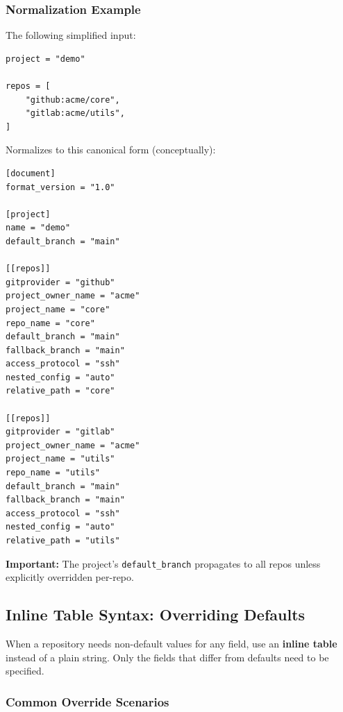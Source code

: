 \subsubsection{Normalization Example}

The following simplified input:

\begin{lstlisting}
project = "demo"

repos = [
    "github:acme/core",
    "gitlab:acme/utils",
]
\end{lstlisting}

Normalizes to this canonical form (conceptually):

\begin{lstlisting}
[document]
format_version = "1.0"

[project]
name = "demo"
default_branch = "main"

[[repos]]
gitprovider = "github"
project_owner_name = "acme"
project_name = "core"
repo_name = "core"
default_branch = "main"
fallback_branch = "main"
access_protocol = "ssh"
nested_config = "auto"
relative_path = "core"

[[repos]]
gitprovider = "gitlab"
project_owner_name = "acme"
project_name = "utils"
repo_name = "utils"
default_branch = "main"
fallback_branch = "main"
access_protocol = "ssh"
nested_config = "auto"
relative_path = "utils"
\end{lstlisting}

\textbf{Important:} The project's \texttt{default\_branch} propagates to all repos
unless explicitly overridden per-repo.

\subsection{Inline Table Syntax: Overriding Defaults}
\label{subsec:cgs-inline}

When a repository needs non-default values for any field, use an \textbf{inline
table} instead of a plain string. Only the fields that differ from defaults
need to be specified.

\subsubsection{Common Override Scenarios}

